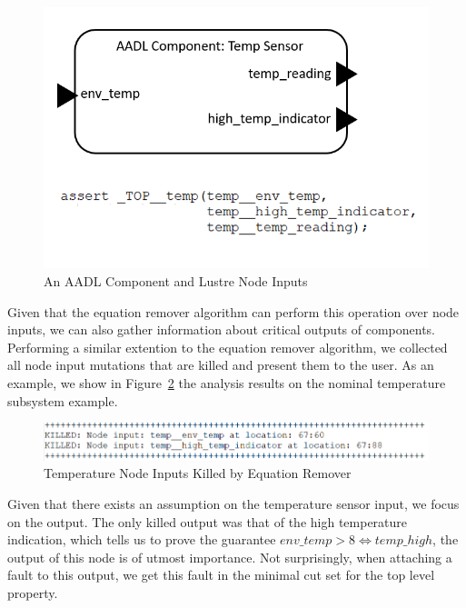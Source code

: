 \begin{figure}[h]
	\begin{center}
		\includegraphics[scale=0.8]{images/nodeInputsLustre.PNG}
	\end{center}
	\caption{An AADL Component and Lustre Node Inputs}
	\label{fig:nodeInputsLustre}
\end{figure}

Given that the equation remover algorithm can perform this operation over node inputs, we can also gather information about critical outputs of components. Performing a similar extention to the equation remover algorithm, we collected all node input mutations that are killed and present them to the user. As an example, we show in Figure~\ref{fig:nodeInputsKilled} the analysis results on the nominal temperature subsystem example. 

\begin{figure}[h]
	\begin{center}
		\includegraphics[scale=0.6]{images/nodeInputsKilled.PNG}
	\end{center}
	\caption{Temperature Node Inputs Killed by Equation Remover}
	\label{fig:nodeInputsKilled}
\end{figure}

Given that there exists an assumption on the temperature sensor input, we focus on the output. The only killed output was that of the high temperature indication, which tells us to prove the guarantee $\mathit{env\_temp} > 8 \iff \mathit{temp\_high}$, the output of this node is of utmost importance. Not surprisingly, when attaching a fault to this output, we get this fault in the minimal cut set for the top level property. 

